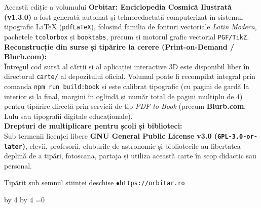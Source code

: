 \documentclass[11pt,a4paper,twoside,openany]{book}
\newcounter{orbitartmp}
\newcommand{\orbitarPadToModFour}[1]{%
  \clearpage
  \loop
    \setcounter{orbitartmp}{\value{page}}%
    \divide\value{orbitartmp} by 4\relax
    \multiply\value{orbitartmp} by 4\relax
    \setcounter{orbitartmp}{\numexpr\value{page}-\value{orbitartmp}\relax}%
  \ifnum\value{orbitartmp}=#1\relax
  \else
    \thispagestyle{empty}\mbox{}\clearpage
  \repeat
}
\begin{document}
\begin{tcolorbox}[orbitarlightyear]
\footnotesize
Această ediție a volumului \textbf{Orbitar: Enciclopedia Cosmică Ilustrată (v1.3.0)} a fost generată automat și tehnoredactată computerizat în sistemul tipografic \LaTeX{} (\texttt{pdfLaTeX}), folosind familia de fonturi vectoriale \emph{Latin Modern}, pachetele \texttt{tcolorbox} și \texttt{booktabs}, precum și motorul grafic vectorial \texttt{PGF/TikZ}.\\[4pt]
\textbf{Reconstrucție din surse și tipărire la cerere (Print-on-Demand / Blurb.com):}\\
Întregul cod sursă al cărții și al aplicației interactive 3D este disponibil liber în directorul \texttt{carte/} al depozitului oficial. Volumul poate fi recompilat integral prin comanda \texttt{npm run build:book} și este calibrat tipografic (cu pagini de gardă la interior și la final, margini în oglindă și număr total de pagini multiplu de 4) pentru tipărire directă prin servicii de tip \emph{PDF-to-Book} (precum \textbf{Blurb.com}, Lulu sau tipografii digitale educaționale).\\[4pt]
\textbf{Drepturi de multiplicare pentru școli și biblioteci:}\\
Sub termenii licenței libere \textbf{GNU General Public License v3.0 (\texttt{GPL-3.0-or-later})}, elevii, profesorii, cluburile de astronomie și bibliotecile au libertatea deplină de a tipări, fotoscana, partaja și utiliza această carte în scop didactic sau personal.
\end{tcolorbox}

\vfill
\begin{center}
  {\color{orbitarMuted}\footnotesize Tipărit sub semnul științei deschise \quad$\bullet$\quad \texttt{https://orbitar.ro}}
\end{center}
\clearpage

\orbitarPadToModFour{0}

\thispagestyle{empty}
\end{document}
